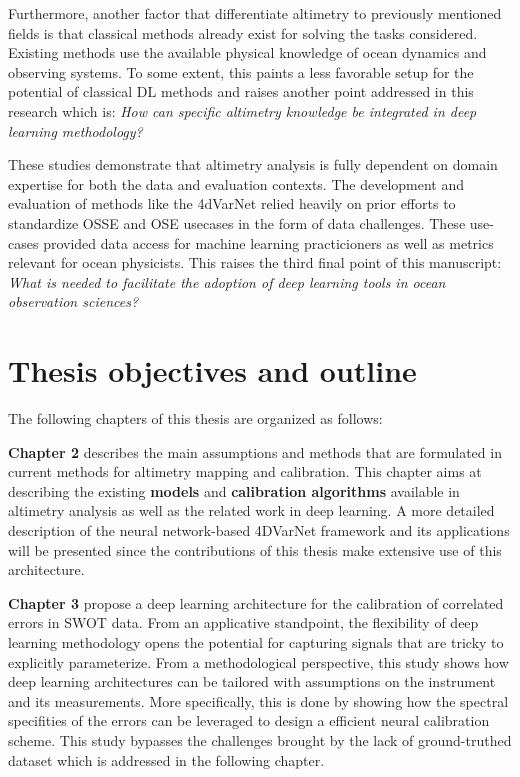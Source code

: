 \begin{bibunit}
Furthermore, another factor that differentiate altimetry to previously mentioned fields is that classical methods already exist for solving the tasks considered. Existing methods use the available physical knowledge of ocean dynamics and observing systems. To some extent, this paints a less favorable setup for the potential of classical DL methods and raises another point addressed in this research which is: \textit{How can specific altimetry knowledge be integrated in deep learning methodology?}


These studies demonstrate that altimetry analysis is fully dependent on domain expertise for both the data and evaluation contexts.
The development and evaluation of methods like the 4dVarNet relied heavily on prior efforts to standardize OSSE and OSE usecases in the form of data challenges\cite{ballarottaOceandatachallenges2020a_SSH_mapping_NATL60Material2020,ballarottaOceandatachallenges2021a_SSH_mapping_OSEMaterial2021}. These use-cases provided data access for machine learning practicioners as well as metrics relevant for ocean physicists. 
This raises the third final point of this manuscript: \textit{What is needed to facilitate the adoption of deep learning tools in ocean observation sciences?}




\section{Thesis objectives and outline}

The following chapters of this thesis are organized as follows:

\textbf{Chapter 2} describes the main assumptions and methods that are formulated in current methods for altimetry mapping and calibration. This chapter aims at describing the existing \textbf{models} and \textbf{calibration algorithms} available in altimetry analysis as well as the related work in deep learning. A more detailed description of the neural network-based 4DVarNet framework and its applications will be presented since the contributions of this thesis make extensive use of this architecture.

\textbf{Chapter 3} propose a deep learning architecture for the calibration of correlated errors in SWOT data.
From an applicative standpoint, the flexibility of deep learning methodology opens the potential for capturing signals that are tricky to explicitly parameterize.
From a methodological perspective, this study shows how deep learning architectures can be tailored with assumptions on the instrument and its measurements.
More specifically, this is done by showing how the spectral specifities of the errors can be leveraged to design a efficient neural calibration scheme.
This study bypasses the challenges brought by the lack of ground-truthed dataset which is addressed in the following chapter.



\end{bibunit}
